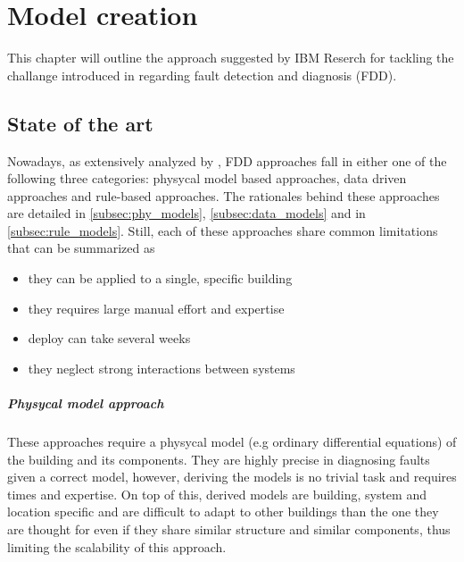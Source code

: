 \chapter{Model creation} \label{ch:model}

This chapter will outline the approach suggested by IBM Reserch for tackling the challange introduced in \textbf{} regarding fault detection and diagnosis (FDD). %

\section{State of the art}
Nowadays, as extensively analyzed by \textcite{methods_for_diagnostic}, FDD approaches fall in either one of the following three categories: physycal model based approaches, data driven approaches and rule-based approaches. The rationales behind these approaches are detailed in \autoref{subsec:phy_models}, \autoref{subsec:data_models} and in \autoref{subsec:rule_models}. Still, each of these approaches share common limitations that can be summarized as
\begin{itemize}
  \item they can be applied to a single, specific building
  \item they requires large manual effort and expertise
  \item deploy can take several weeks
  \item they neglect strong interactions between systems
\end{itemize}

\paragraph{Physycal model approach} \label{subsec:phy_models}
These approaches require a physycal model (e.g ordinary differential equations) of the building and its components. They are highly precise in diagnosing faults given a correct model, however, deriving the models is no trivial task and requires times and expertise. On top of this, derived models are building, system and location specific and are difficult to adapt to other buildings than the one they are thought for even if they share similar structure and similar components, thus limiting the scalability of this approach.

